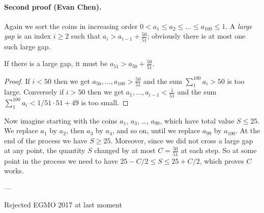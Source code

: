 \paragraph{Second proof (Evan Chen).}
Again we sort the coins in increasing order
$0 < a_1 \le a_2 \le \dots \le a_{100} \le 1$.
A \emph{large gap} is an index $i \ge 2$
such that $a_i > a_{i-1} + \frac{50}{51}$;
obviously there is at most one such large gap.

\begin{claim*}
If there is a large gap,
it must be $a_{51} > a_{50} + \frac{50}{51}$.
\end{claim*}
\begin{proof}
If $i < 50$ then we get $a_{50}, \dots, a_{100} > \frac{50}{51}$
and the sum $\sum_1^{100} a_i > 50$ is too large.
Conversely if $i > 50$ then we get
$a_1, \dots, a_{i-1} < \frac{1}{51}$
and the sum $\sum_1^{100} a_i < 1/51 \cdot 51 + 49$ is too small.
\end{proof}

Now imagine starting with the coins $a_1$, $a_3$, \dots, $a_{99}$,
which have total value $S \le 25$.
We replace $a_1$ by $a_2$,
then $a_3$ by $a_4$, and so on,
until we replace $a_{99}$ by $a_{100}$.
At the end of the process we have $S \ge 25$.
Moreover, since we did not cross a large gap at any point,
the quantity $S$ changed by at most $C = \frac{50}{51}$ at each step.
So at some point in the process we need to have $25-C/2 \le S \le 25+C/2$,
which proves $C$ works.

---

Rejected EGMO 2017 at last moment
